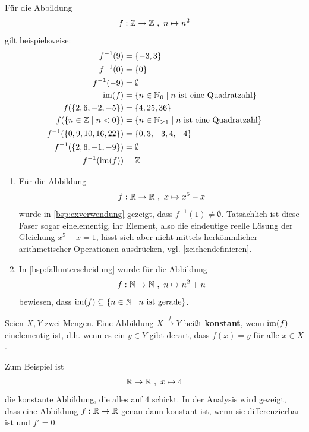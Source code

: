 \begin{bsp}
    Für die Abbildung
    \begin{align*}
        f: \mathbb Z \to \mathbb Z \ ,\ n \mapsto n^2
    \end{align*}
    gilt beispielsweise:
    \begin{align*}
        f^{-1}(9) & = \{-3,3\} \\
        f^{-1}(0) & = \{0\} \\
        f^{-1}(-9) & = \emptyset \\
        \im(f) & = \{n\in \N_0 \mid n\ \text{ist eine Quadratzahl} \} \\
        f( \{2,6,-2,-5\}) & = \{4,25,36\} \\
        f(\{n\in \Z \mid n < 0  \}) & = \{n\in \N_{\ge 1} \mid n\ \text{ist eine Quadratzahl} \} \\
        f^{-1}(\{0,9,10,16,22\}) & = \{0,3,-3,4,-4\} \\
        f^{-1}(\{2,6,-1,-9\}) & = \emptyset \\
        f^{-1}(\im(f)) & = \Z
    \end{align*}
\end{bsp}


\begin{bsp}[*] \quad
    \begin{enumerate}
        \item Für die Abbildung
            \[ f : \R \to \R \ ,\ x\mapsto x^5-x \]
        wurde in \cref{bsp:exverwendung} gezeigt, dass $f^{-1}(1)\neq\emptyset$. Tatsächlich ist diese Faser sogar einelementig, ihr Element, also die eindeutige reelle Lösung der Gleichung $x^5-x=1$, lässt sich aber nicht mittels herkömmlicher arithmetischer Operationen ausdrücken, vgl. \cref{zeichendefinieren}.
        \item In \cref{bsp:fallunterscheidung} wurde für die Abbildung
            \[ f : \N \to \N \ ,\ n \mapsto n^2+n \]
        bewiesen, dass $\operatorname{im}(f)\subseteq \{n\in \mathbb N\mid n\ \text{ist gerade}\}$.
    \end{enumerate}
\end{bsp}


\begin{de} 
Seien $X,Y$ zwei Mengen. Eine Abbildung $X\xrightarrow{f} Y$ heißt \textbf{konstant}, wenn $\operatorname{im}(f)$ einelementig ist, d.h. wenn es ein $y\in Y$ gibt derart, dass $f(x)=y$ für alle $x\in X$.
\end{de}


\begin{bsp}
Zum Beispiel ist
\[ \mathbb R \to \mathbb R \ ,\ x\mapsto 4 \]
die konstante Abbildung, die alles auf $4$ schickt. In der Analysis wird gezeigt, dass eine Abbildung $f : \mathbb R\to \mathbb R$ genau dann konstant ist, wenn sie differenzierbar ist und $f'=0$.
\end{bsp}





